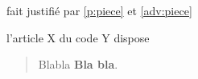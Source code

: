 \item \label{f:fait} fait justifié par \ref{p:piece} et \ref{adv:piece}

\item \label{a:cp226-16} l'article X du code Y dispose
\begin{quote}
    Blabla \textbf{Bla bla}.
\end{quote}